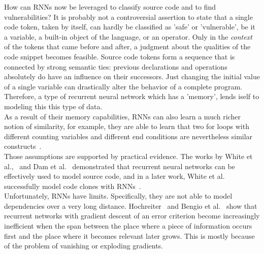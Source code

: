 \documentclass[
a4paper,
pagesize,
pdftex,
12pt,
twoside, %
BCOR=5mm, %
ngerman,
fleqn,
final,
]{scrartcl}
\begin{document}
	How can RNNs now be leveraged to classify source code and to find vulnerabilities? It is probably not a controversial assertion to state that a single code token, taken by itself, can hardly be classified as 'safe' or 'vulnerable', be it a variable, a built-in object of the language, or an operator. Only in the \textit{context} of the tokens that came before and after, a judgment about the qualities of the code snippet becomes feasible. Source code tokens form a sequence that is connected by strong semantic ties: previous declarations and operations absolutely do have an influence on their successors. Just changing the initial value of a single variable can drastically alter the behavior of a complete program. Therefore, a type of recurrent neural network which has a 'memory', lends iself to modeling this this type of data.\\
	As a result of their memory capabilities, RNNs can also learn a much richer notion of similarity, for example, they are able to learn that two for loops with different counting variables and different end conditions are nevertheless similar constructs~\cite{Allamanis.2018}. \\
	Those assumptions are supported by practical evidence. The works by White et al.,~\cite{White.2015} and Dam et al.~\cite{Dam.2016b,Dam.2016} demonstrated that recurrent neural networks can be effectively used to model source code, and in a later work, White et al. successfully model code clones with RNNs~\cite{White.2016}.\\
	Unfortunately, RNNs have limits. Specifically, they are not able to model dependencies over a very long distance. Hochreiter~\cite{Hochreiter.1991} and Bengio et al.~\cite{Bengio.1994} show that recurrent networks with gradient descent of an error criterion become increasingly inefficient when the span between the place where a piece of information occurs first and the place where it becomes relevant later grows. This is mostly because of the problem of vanishing or exploding gradients.\\
	
\end{document}
